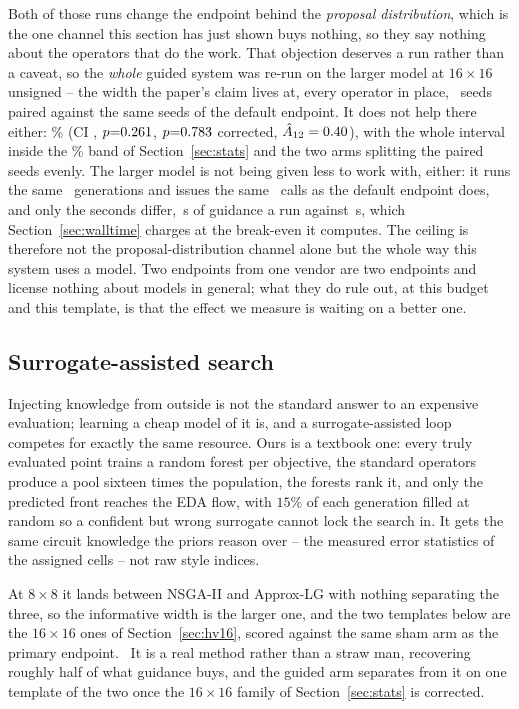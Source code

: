 \documentclass[acmsmall,review,anonymous]{acmart}
\begin{document}
Both of those runs change the endpoint behind the \emph{proposal distribution},
which is the one channel this section has just shown buys nothing, so they say
nothing about the operators that do the work.  That objection deserves a run
rather than a caveat, so the \emph{whole} guided system was re-run on the larger
model at $16\times16$ unsigned -- the width the paper's claim lives at, every
operator in place, \ProFullN\ seeds paired against the same seeds of the default
endpoint.  It does not help there either: \ProFull\% (CI \ProFullCI,
$p{=}0.261$, $p{=}0.783$ corrected, $\hat{A}_{12}=0.40$), with the
whole interval inside the \NullSixteen\% band of Section~\ref{sec:stats} and the
two arms splitting the paired seeds evenly.  The larger model is not being given
less to work with, either: it runs the same \GensProFullG\ generations and
issues the same \CallsProFullG\ calls as the default endpoint does, and only the
seconds differ, \SecProFullG\,s of guidance a run against
\GuidanceSecondsWide\,s, which Section~\ref{sec:walltime} charges at the
break-even it computes.  The ceiling is therefore not the proposal-distribution
channel alone but the whole way this system uses a model.  Two endpoints from
one vendor are two endpoints and license nothing about models in general; what
they do rule out, at this budget and this template, is that the effect we
measure is waiting on a better one.

\subsection{Surrogate-assisted search}
\label{sec:surrogate}
Injecting knowledge from outside is not the standard answer to an expensive
evaluation; learning a cheap model of it is, and a surrogate-assisted loop
competes for exactly the same resource.  Ours is a textbook one: every truly
evaluated point trains a random forest per objective, the standard operators
produce a pool sixteen times the population, the forests rank it, and only the
predicted front reaches the EDA flow, with $15\%$ of each generation filled at
random so a confident but wrong surrogate cannot lock the search in.  It gets
the same circuit knowledge the priors reason over -- the measured error
statistics of the assigned cells -- not raw style indices.

At $8\times8$ it lands between NSGA-II and Approx-LG with nothing separating
the three, so the informative width is the larger one, and the two templates
below are the $16\times16$ ones of Section~\ref{sec:hv16}, scored against the
same sham arm as the primary endpoint.  \SurrogateText\ It is a real method
rather than a straw man, recovering roughly half of what guidance buys, and the
guided arm separates from it on one template of the two once the $16\times16$
family of Section~\ref{sec:stats} is corrected.
\end{document}
